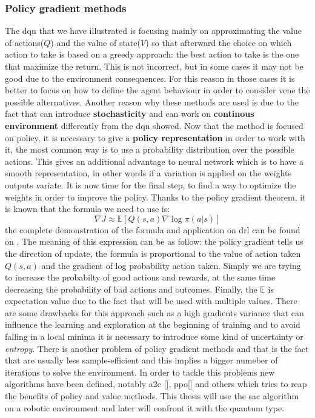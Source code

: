 \subsubsection{Policy gradient methods}
The \acrshort{dqn} that we have illustrated is focusing mainly on approximating the value of actions($Q$) and the value of state($V$) so that afterward the choice on which action to take is based on a greedy approach: the best action to take is the one that maximize the return. This is not incorrect, but in some cases it may not be good due to the environment consequences. For this reason in those cases it is better to focus on how to define the agent behaviour in order to consider vene the possible alternatives. Another reason why these methods are used is due to the fact that can introduce \textbf{stochasticity} and can work on \textbf{continous environment} differently from the \acrshort{dqn} showed.
Now that the method is focused on policy, it is necessary to give a \textbf{policy representation} in order to work with it, the most common way is to use a probability distribution over the possible actions. This gives an additional advantage to neural network which is to have a smooth representation, in other words if a variation is applied on the weights outputs variate.
It is now time for the final step, to find a way to optimize the weights in order to improve the policy. Thanks to the policy gradient theorem, it is known that the formula we need to use is:
\begin{equation}\label{policy_grad_theorem}
	\nabla J \approx \mathbb{E}[Q(s,a) \nabla \log \pi(a|s)]
\end{equation}
the complete demonstration of the formula and application on \acrlong{drl} can be found on \cite{10.5555/3009657.3009806}. The meaning of this expression can be as follow: the policy gradient tells us the direction of update, the formula is proportional to the value of action taken $Q(s,a)$ and the gradient of log probability action taken. Simply we are trying to increase the probabilty of good actions and rewards, at the same time decreasing the probability of bad actions and outcomes. Finally, the $\mathbb{E}$ is expectation value due to the fact that will be used with multiple values.
There are some drawbacks for this approach such as a high gradients variance that can influence the learning and exploration at the beginning of training and to avoid falling in a local minima it is necessary to introduce some kind of uncertainty or \textit{entropy}. There is another problem of policy gradient methods and that is the fact that are usually less sample-efficient and this implies a bigger numeber of iterations to solve the environment. In order to tackle this problems new algorithms have been defined, notably \acrfull{a2c} [\cite{DBLP:journals/corr/WangBHMMKF16}], \acrfull{ppo}[\cite{DBLP:journals/corr/SchulmanWDRK17}] and others which tries to reap the benefits of policy and value methods. This thesis will use the \acrfull{sac} algorithm on a robotic environment and later will confront it with the quantum type.
